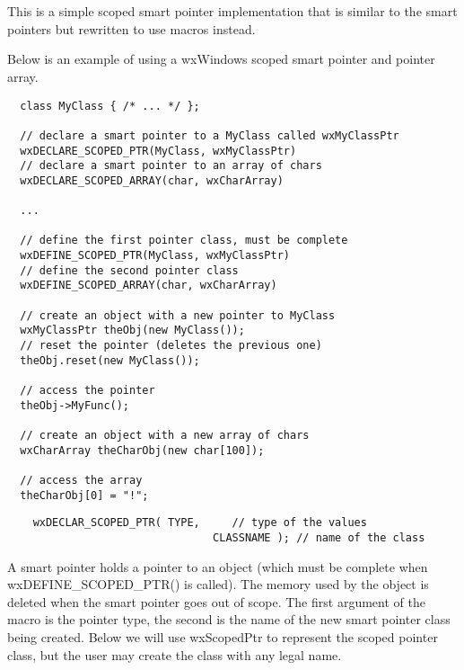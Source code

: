 \section{}\label{wxscopedptr}

This is a simple scoped smart pointer implementation that is similar to 
the  smart pointers but rewritten to
use macros instead.


Below is an example of using a wxWindows scoped smart pointer and 
pointer array.

\begin{verbatim}
  class MyClass { /* ... */ };

  // declare a smart pointer to a MyClass called wxMyClassPtr
  wxDECLARE_SCOPED_PTR(MyClass, wxMyClassPtr)
  // declare a smart pointer to an array of chars
  wxDECLARE_SCOPED_ARRAY(char, wxCharArray)

  ...

  // define the first pointer class, must be complete
  wxDEFINE_SCOPED_PTR(MyClass, wxMyClassPtr)
  // define the second pointer class
  wxDEFINE_SCOPED_ARRAY(char, wxCharArray)

  // create an object with a new pointer to MyClass
  wxMyClassPtr theObj(new MyClass());
  // reset the pointer (deletes the previous one)
  theObj.reset(new MyClass());

  // access the pointer
  theObj->MyFunc();

  // create an object with a new array of chars
  wxCharArray theCharObj(new char[100]);

  // access the array
  theCharObj[0] = "!";
\end{verbatim}


\begin{verbatim}
    wxDECLAR_SCOPED_PTR( TYPE,     // type of the values
                                CLASSNAME ); // name of the class
\end{verbatim}

A smart pointer holds a pointer to an object (which must be complete
when wxDEFINE\_SCOPED\_PTR() is called). The memory used by the object is
deleted when the smart pointer goes out of scope. The first argument
of the macro is the pointer type, the second is the name of the new
smart pointer class being created.  Below we will use wxScopedPtr to
represent the scoped pointer class, but the user may create the class with any
legal name.

